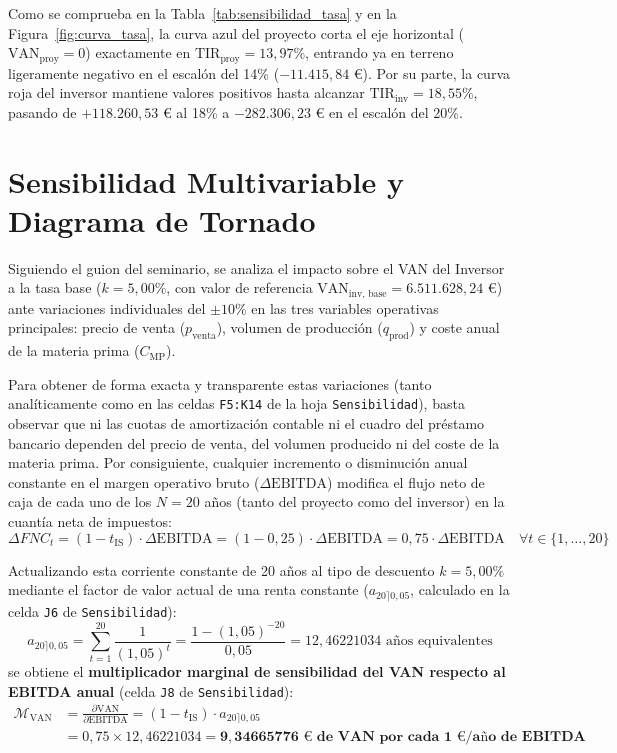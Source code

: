 \documentclass[a4paper,11pt]{report}
\providecommand{\euro}{€}
\begin{document}
Como se comprueba en la Tabla~\ref{tab:sensibilidad_tasa} y en la Figura~\ref{fig:curva_tasa}, la curva azul del proyecto corta el eje horizontal ($\text{VAN}_{\text{proy}} = 0$) exactamente en $\text{TIR}_{\text{proy}} = 13,97\%$, entrando ya en terreno ligeramente negativo en el escalón del 14\% ($-11.415,84\text{ \euro}$). Por su parte, la curva roja del inversor mantiene valores positivos hasta alcanzar $\text{TIR}_{\text{inv}} = 18,55\%$, pasando de $+118.260,53\text{ \euro}$ al 18\% a $-282.306,23\text{ \euro}$ en el escalón del 20\%.

\section{Sensibilidad Multivariable y Diagrama de Tornado}
Siguiendo el guion del seminario, se analiza el impacto sobre el VAN del Inversor a la tasa base ($k = 5,00\%$, con valor de referencia $\text{VAN}_{\text{inv, base}} = 6.511.628,24\text{ \euro}$) ante variaciones individuales del $\pm 10\%$ en las tres variables operativas principales: precio de venta ($p_{\text{venta}}$), volumen de producción ($q_{\text{prod}}$) y coste anual de la materia prima ($C_{\text{MP}}$).

Para obtener de forma exacta y transparente estas variaciones (tanto analíticamente como en las celdas \texttt{F5:K14} de la hoja \texttt{Sensibilidad}), basta observar que ni las cuotas de amortización contable ni el cuadro del préstamo bancario dependen del precio de venta, del volumen producido ni del coste de la materia prima. Por consiguiente, cualquier incremento o disminución anual constante en el margen operativo bruto ($\Delta\text{EBITDA}$) modifica el flujo neto de caja de cada uno de los $N = 20$ años (tanto del proyecto como del inversor) en la cuantía neta de impuestos:
\begin{equation}
    \Delta FNC_t = (1 - t_{\text{IS}})\cdot \Delta\text{EBITDA} = (1 - 0,25)\cdot \Delta\text{EBITDA} = 0,75\cdot \Delta\text{EBITDA} \quad \forall t \in \{1,\dots,20\}
\end{equation}

Actualizando esta corriente constante de 20 años al tipo de descuento $k = 5,00\%$ mediante el factor de valor actual de una renta constante ($a_{20\rceil 0,05}$, calculado en la celda \texttt{J6} de \texttt{Sensibilidad}):
\begin{equation}
    a_{20\rceil 0,05} = \sum_{t=1}^{20} \frac{1}{(1,05)^t} = \frac{1 - (1,05)^{-20}}{0,05} = 12,46221034\text{ años equivalentes}
\end{equation}
se obtiene el \textbf{multiplicador marginal de sensibilidad del VAN respecto al EBITDA anual} (celda \texttt{J8} de \texttt{Sensibilidad}):
\begin{equation}\label{eq:multiplicador_van}
\begin{aligned}
    \mathcal{M}_{\text{VAN}} &= \frac{\partial\text{VAN}}{\partial\text{EBITDA}} = (1 - t_{\text{IS}})\cdot a_{20\rceil 0,05} \\
    &= 0,75 \times 12,46221034 = \mathbf{9,34665776\text{ \euro{} de VAN por cada 1 \euro/año de EBITDA}}
\end{aligned}
\end{equation}
\end{document}
